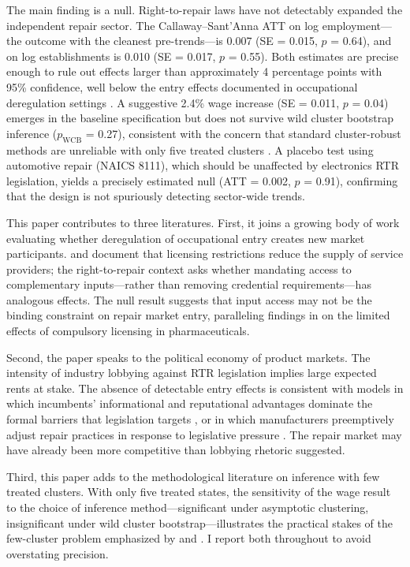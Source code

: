 \documentclass[12pt]{article}
\begin{document}
The main finding is a null. Right-to-repair laws have not detectably expanded the independent repair sector. The Callaway--Sant'Anna ATT on log employment---the outcome with the cleanest pre-trends---is 0.007 (SE = 0.015, $p$ = 0.64), and on log establishments is 0.010 (SE = 0.017, $p$ = 0.55). Both estimates are precise enough to rule out effects larger than approximately 4 percentage points with 95\% confidence, well below the entry effects documented in occupational deregulation settings \citep{thornton2015effects}. A suggestive 2.4\% wage increase (SE = 0.011, $p$ = 0.04) emerges in the baseline specification but does not survive wild cluster bootstrap inference ($p_{\text{WCB}}$ = 0.27), consistent with the concern that standard cluster-robust methods are unreliable with only five treated clusters \citep{cameron2008bootstrap}. A placebo test using automotive repair (NAICS 8111), which should be unaffected by electronics RTR legislation, yields a precisely estimated null (ATT = 0.002, $p$ = 0.91), confirming that the design is not spuriously detecting sector-wide trends.

This paper contributes to three literatures. First, it joins a growing body of work evaluating whether deregulation of occupational entry creates new market participants. \citet{kleiner2006licensing} and \citet{thornton2015effects} document that licensing restrictions reduce the supply of service providers; the right-to-repair context asks whether mandating access to complementary inputs---rather than removing credential requirements---has analogous effects. The null result suggests that input access may not be the binding constraint on repair market entry, paralleling findings in \citet{branstetter2019right} on the limited effects of compulsory licensing in pharmaceuticals.

Second, the paper speaks to the political economy of product markets. The intensity of industry lobbying against RTR legislation \citep{koebler2020repair, perzanowski2022right} implies large expected rents at stake. The absence of detectable entry effects is consistent with models in which incumbents' informational and reputational advantages dominate the formal barriers that legislation targets \citep{tirole1988theory}, or in which manufacturers preemptively adjust repair practices in response to legislative pressure \citep{stigler1971theory}. The repair market may have already been more competitive than lobbying rhetoric suggested.

Third, this paper adds to the methodological literature on inference with few treated clusters. With only five treated states, the sensitivity of the wage result to the choice of inference method---significant under asymptotic clustering, insignificant under wild cluster bootstrap---illustrates the practical stakes of the few-cluster problem emphasized by \citet{cameron2008bootstrap} and \citet{mackinnon2022cluster}. I report both throughout to avoid overstating precision.
\end{document}
